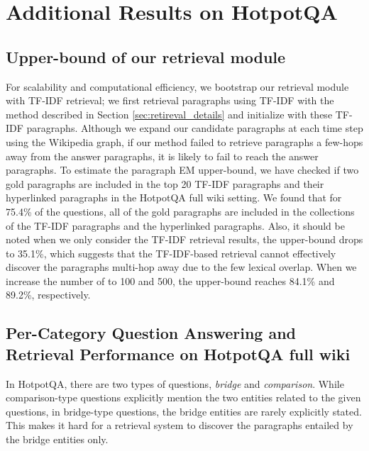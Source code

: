 \documentclass{article} \usepackage{iclr2020_conference,times}
\begin{document}
\section{Additional Results on HotpotQA}
\subsection{Upper-bound of our retrieval module}
For scalability and computational efficiency, we bootstrap our retrieval module with TF-IDF retrieval; we first retrieval  paragraphs using TF-IDF with the method described in Section \ref{sec:retireval_details} and initialize  with these TF-IDF paragraphs.
Although we expand our candidate paragraphs at each time step using the Wikipedia graph, if our method failed to retrieve paragraphs a few-hops away from the answer paragraphs, it is likely to fail to reach the answer paragraphs. 
To estimate the paragraph EM upper-bound, we have checked if two gold paragraphs are included in the top 20 TF-IDF paragraphs and their hyperlinked paragraphs in the HotpotQA full wiki setting.
We found that for 75.4\% of the questions, all of the gold paragraphs are included in the collections of the TF-IDF paragraphs and the hyperlinked paragraphs. 
Also, it should be noted when we only consider the TF-IDF retrieval results, the upper-bound drops to 35.1\%, which suggests that the TF-IDF-based retrieval cannot effectively discover the paragraphs multi-hop away due to the few lexical overlap. 
When we increase the number of  to 100 and 500, the upper-bound reaches 84.1\% and 89.2\%, respectively. 



\subsection{Per-Category Question Answering and Retrieval Performance on HotpotQA full wiki}
In HotpotQA, there are two types of questions, {\it bridge} and {\it comparison}. 
While comparison-type questions explicitly mention the two entities related to the given questions, in bridge-type questions, the bridge entities are rarely explicitly stated. 
This makes it hard for a retrieval system to discover the paragraphs entailed by the bridge entities only. 
\end{document}
